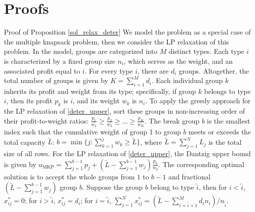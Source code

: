 \clearpage
\section{Proofs}

\begin{pf}{Proof of Proposition \ref{sol_relax_deter}}
  We model the problem as a special case of the multiple knapsack problem, then we consider the LP relaxation of this problem. In the model, groups are categorized into $M$ distinct types. Each type $i$ is characterized by a fixed group size $n_i$, which serves as the weight, and an associated profit equal to $i$. For every type $i$, there are $d_i$ groups. Altogether, the total number of groups is given by $K = \sum_{i=1}^{M} d_i$. Each individual group $k$ inherits its profit and weight from its type; specifically, if group $k$ belongs to type $i$, then its profit $p_k$ is $i$, and its weight $w_k$ is $n_i$. To apply the greedy approach for the LP relaxation of \eqref{deter_upper}, sort these groups in non-increasing order of their profit-to-weight ratios: $\frac{p_1}{w_1} \geq \frac{p_2}{w_2} \geq \ldots \geq \frac{p_K}{w_K}$. The break group $b$ is the smallest index such that the cumulative weight of group 1 to group $b$ meets or exceeds the total capacity $\tilde{L}$: $b=\min \{j: \sum_{k=1}^j w_k \geq \tilde{L}\}$, where $\tilde{L} = \sum_{j=1}^{N} L_j$ is the total size of all rows. For the LP relaxation of \eqref{deter_upper}, the Dantzig upper bound \citep{dantzig1957discrete} is given by $u_{\mathrm{MKP}}=\sum_{j=1}^{b-1} p_j+\left(\tilde{L}-\sum_{j=1}^{b-1} w_j\right) \frac{p_b}{w_b}$. The corresponding optimal solution is to accept the whole groups from $1$ to $b-1$ and fractional $(\tilde{L}-\sum_{j=1}^{b-1} w_j)$ group $b$. Suppose the group $b$ belong to type $\tilde{i}$, then for $i < \tilde{i}$, $x_{ij}^{*} = 0$; for $i > \tilde{i}$, $x_{ij}^{*} = d_{i}$; for $i = \tilde{i}$, $\sum_{j=1}^{N} x_{ij}^{*} = (\tilde{L} - \sum_{i = \tilde{i}+1}^{M} {d_i n_i})/ n_{\tilde{i}}$.




\end{pf}


